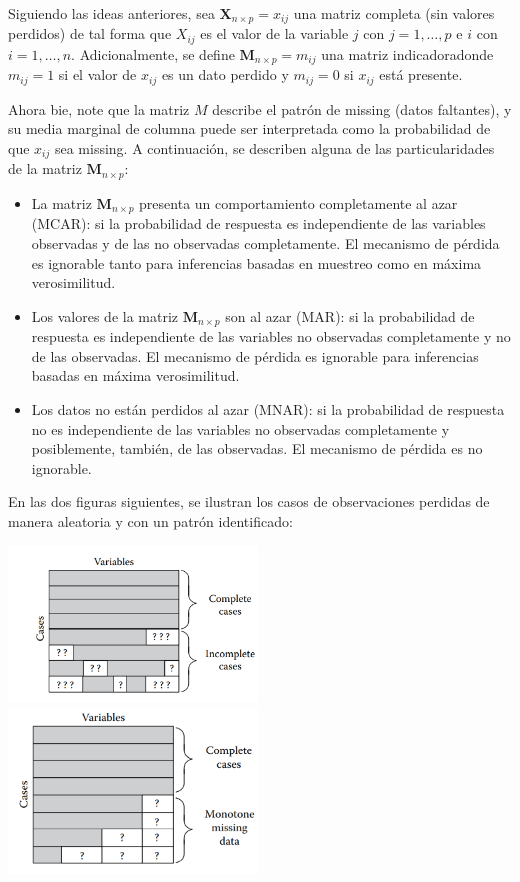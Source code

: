 \documentclass[
  12pt,
]{book}
\begin{document}
Siguiendo las ideas anteriores, sea \(\boldsymbol{X}_{n \times p} = x_{ij}\) una matriz completa (sin valores perdidos) de tal forma que \(X_{ij}\) es el valor de la variable \(j\) con \(j=1, \dots, p\) e \(i\) con \(i=1, \dots, n\). Adicionalmente, se define \(\boldsymbol{M}_{n \times p} = m_{ij}\) una matriz indicadoradonde \(m_{ij} = 1\) si el valor de \(x_{ij}\) es un dato perdido y \(m_{ij}=0\) si \(x_{ij}\) está presente.

Ahora bie, note que la matriz \(M\) describe el patrón de missing (datos faltantes), y su media marginal de columna puede ser interpretada como la probabilidad de que \(x_{ij}\) sea missing. A continuación, se describen alguna de las particularidades de la matriz \(\boldsymbol{M}_{n \times p}\):

\begin{itemize}
\item
  La matriz \(\boldsymbol{M}_{n \times p}\) presenta un comportamiento completamente al azar (MCAR): si la probabilidad de respuesta es independiente de las variables observadas y de las no observadas completamente. El mecanismo de pérdida es ignorable tanto para inferencias basadas en muestreo como en máxima verosimilitud.
\item
  Los valores de la matriz \(\boldsymbol{M}_{n \times p}\) son al azar (MAR): si la probabilidad de respuesta es independiente de las variables no observadas completamente y no de las observadas. El mecanismo de pérdida es ignorable para inferencias basadas en máxima verosimilitud.
\item
  Los datos no están perdidos al azar (MNAR): si la probabilidad de respuesta no es independiente de las variables no observadas completamente y posiblemente, también, de las observadas. El mecanismo de pérdida es no ignorable.
\end{itemize}

En las dos figuras siguientes, se ilustran los casos de observaciones perdidas de manera aleatoria y con un patrón identificado:

\includegraphics[width=2.60417in,height=\textheight]{Imagenes/Cap 8/fig1.png}
\includegraphics[width=2.60417in,height=\textheight]{Imagenes/Cap 8/fig2.png}
\end{document}
